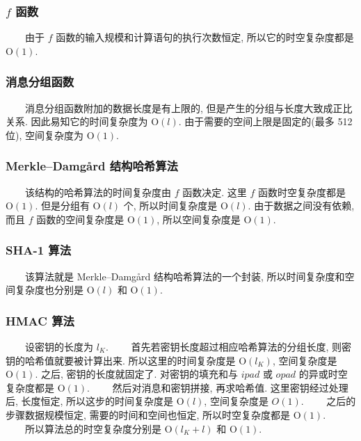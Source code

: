 \documentclass[12pt,a4paper]{article}
\begin{document}
\subsubsection*{$ f $ 函数}

　　由于 $ f $ 函数的输入规模和计算语句的执行次数恒定, 所以它的时空复杂度都是 $ \mathrm{O}(1) $.

\subsubsection*{消息分组函数}

　　消息分组函数附加的数据长度是有上限的, 但是产生的分组与长度大致成正比关系. 因此易知它的时间复杂度为 $ \mathrm{O}(l) $. 由于需要的空间上限是固定的(最多 512 位), 空间复杂度为 $ \mathrm{O}(1) $. 

\subsubsection*{Merkle–Damgård 结构哈希算法}

　　该结构的哈希算法的时间复杂度由 $ f $ 函数决定. 这里 $ f $ 函数时空复杂度都是 $ \mathrm{O}(1) $. 但是分组有 $ \mathrm{O}(l) $ 个, 所以时间复杂度是 $ \mathrm{O}(l) $. 由于数据之间没有依赖, 而且 $ f $ 函数的空间复杂度是 $ \mathrm{O}(1) $, 所以空间复杂度是 $ \mathrm{O}(1) $. 

\subsubsection*{SHA-1 算法}

　　该算法就是 Merkle–Damgård 结构哈希算法的一个封装, 所以时间复杂度和空间复杂度也分别是 $ \mathrm{O}(l) $ 和 $ \mathrm{O}(1) $. 

\subsubsection*{HMAC 算法}

　　设密钥的长度为 $ l_K $. 
\newline
　　首先若密钥长度超过相应哈希算法的分组长度, 则密钥的哈希值就要被计算出来. 所以这里的时间复杂度是 $ \mathrm{O}(l_K) $, 空间复杂度是 $ \mathrm{O}(1) $. 之后, 密钥的长度就固定了. 对密钥的填充和与 $ ipad $ 或 $ opad $ 的异或时空复杂度都是 $ \mathrm{O}(1) $. 
\newline
　　然后对消息和密钥拼接, 再求哈希值. 这里密钥经过处理后, 长度恒定, 所以这步的时间复杂度是 $ \mathrm{O}(l) $, 空间复杂度是 $ O(1) $. 
\newline
　　之后的步骤数据规模恒定, 需要的时间和空间也恒定, 所以时空复杂度都是 $ \mathrm{O}(1) $. 
\newline
　　所以算法总的时空复杂度分别是 $ \mathrm{O}(l_K + l) $ 和 $ \mathrm{O}(1) $. 
\end{document}
